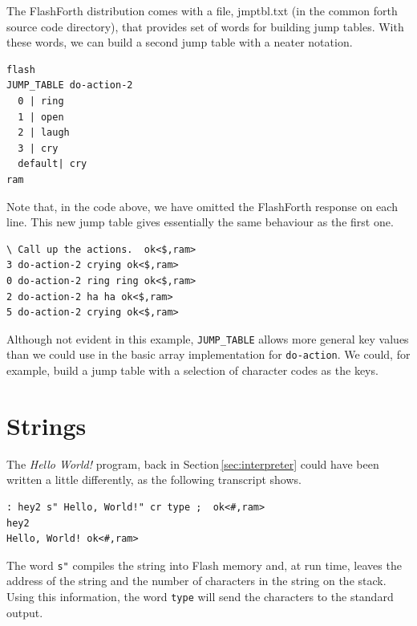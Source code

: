 \documentclass[12pt,a4paper]{article}
\begin{document}
\medskip
The FlashForth distribution comes with a file, jmptbl.txt (in the common forth source code directory),
that provides set of words for building jump tables.
With these words, we can build a second jump table with a neater notation.
\begin{verbatim}
flash
JUMP_TABLE do-action-2
  0 | ring
  1 | open
  2 | laugh 
  3 | cry
  default| cry
ram
\end{verbatim}
Note that, in the code above, we have omitted the FlashForth response on each line.
This new jump table gives essentially the same behaviour as the first one.
\begin{verbatim}
\ Call up the actions.  ok<$,ram>
3 do-action-2 crying ok<$,ram>
0 do-action-2 ring ring ok<$,ram>
2 do-action-2 ha ha ok<$,ram>
5 do-action-2 crying ok<$,ram>
\end{verbatim}
Although not evident in this example, \verb!JUMP_TABLE! allows more general key values
than we could use in the basic array implementation for \verb!do-action!.
We could, for example, build a jump table with a selection of character codes as the keys.

\newpage
\section{Strings}
%
The \textit{Hello World!} program, back in Section\,\ref{sec:interpreter}
could have been written a little differently, as the following transcript shows.
\begin{verbatim}
: hey2 s" Hello, World!" cr type ;  ok<#,ram>
hey2 
Hello, World! ok<#,ram>
\end{verbatim}
The word \verb!s"! compiles the string into Flash memory and, at run time,
leaves the address of the string and the number of characters in the string
on the stack.
Using this information, the word \verb!type! will send the characters to the standard output. 

\medskip
\end{document}
